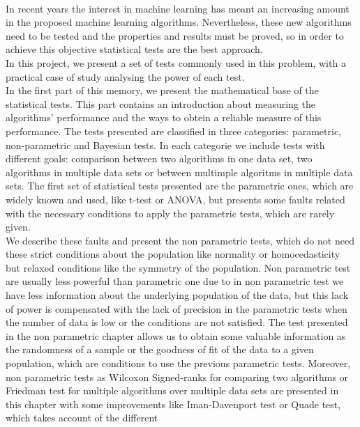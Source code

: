 \vspace{0.7cm}
\\

	In recent years the interest in machine learning has 
meant an increasing amount in the proposed machine learning 
algorithms. Nevertheless, these new algorithms need to be 
tested and the properties and results must be proved, so in 
order to achieve this objective statistical tests are the 
best approach.\\
	In this project, we present a set of tests commonly used 
in this problem, with a practical case of study analysing the 
power of each test. \\
	In the first part of this memory, we present the 
mathematical base of the statistical tests. This part 
contains an introduction about measuring the algorithms’ 
performance and the ways to obtein a reliable measure of this 
performance. The tests presented are classified in three 
categories: parametric, non-parametric and Bayesian tests. In 
each categorie we include tests with different goals: 
comparison between two algorithms in one data set, two 
algorithms in multiple data sets or between multimple 
algoritms in multiple data sets. The first set of statistical 
tests presented are the parametric ones, which are widely 
known and used, like t-test or ANOVA, but presents some 
faults related with the necessary conditions to apply the 
parametric tests, which are rarely given. \\
	We describe these faults and present the non parametric 
tests, which do not need these strict conditions about the 
population like normality or homocedasticity but relaxed 
conditions like the symmetry of the population. Non 
parametric test are usually less powerful than parametric one 
due to in non parametric test we have less information about 
the underlying population of the data, but this lack of power 
is compensated with the lack of precision in the parametric 
tests when the number of data is low or the conditions are 
not satisfied. The test presented in the non parametric 
chapter allows us to obtain some valuable information as the 
randomness of a sample or the goodness of fit of the data to 
a given population, which are conditions to use the previous 
parametric tests. Moreover, non parametric tests as Wilcoxon 
Signed-ranks for comparing two algorithms or Friedman test 
for multiple algorithms over multiple data sets are presented 
in this chapter with some improvements like Iman-Davenport 
test or Quade test, which takes account of the different 
